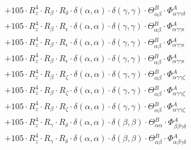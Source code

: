 \documentclass{article}
\begin{document}
\begin{subequations}
\begin{gather}
\begin{array}{c}
 \\[0.2em] 		 + 105 \cdot R_{z}^{4} \cdot R_{\beta{}} \cdot R_{\delta{}} \cdot \delta{}\left(\alpha{}, \alpha{}\right) \cdot \delta{}\left(\gamma{}, \gamma{}\right) \cdot \Theta{}^{B}_{\alpha{}\beta{}} \cdot \Phi{}^{A}_{\alpha{}\gamma{}\gamma{}\delta{}} 
 \\[0.2em] 		 + 105 \cdot R_{z}^{4} \cdot R_{\beta{}} \cdot R_{\epsilon{}} \cdot \delta{}\left(\alpha{}, \alpha{}\right) \cdot \delta{}\left(\gamma{}, \gamma{}\right) \cdot \Theta{}^{B}_{\alpha{}\beta{}} \cdot \Phi{}^{A}_{\alpha{}\gamma{}\gamma{}\epsilon{}} 
 \\[0.2em] 		 + 105 \cdot R_{z}^{4} \cdot R_{\beta{}} \cdot R_{\epsilon{}} \cdot \delta{}\left(\alpha{}, \alpha{}\right) \cdot \delta{}\left(\gamma{}, \gamma{}\right) \cdot \Theta{}^{B}_{\alpha{}\beta{}} \cdot \Phi{}^{A}_{\alpha{}\gamma{}\gamma{}\epsilon{}} 
 \\[0.2em] 		 + 105 \cdot R_{z}^{4} \cdot R_{\beta{}} \cdot R_{\epsilon{}} \cdot \delta{}\left(\alpha{}, \alpha{}\right) \cdot \delta{}\left(\gamma{}, \gamma{}\right) \cdot \Theta{}^{B}_{\alpha{}\beta{}} \cdot \Phi{}^{A}_{\alpha{}\gamma{}\gamma{}\epsilon{}} 
 \\[0.2em] 		 + 105 \cdot R_{z}^{4} \cdot R_{\beta{}} \cdot R_{\zeta{}} \cdot \delta{}\left(\alpha{}, \alpha{}\right) \cdot \delta{}\left(\gamma{}, \gamma{}\right) \cdot \Theta{}^{B}_{\alpha{}\beta{}} \cdot \Phi{}^{A}_{\alpha{}\gamma{}\gamma{}\zeta{}} 
 \\[0.2em] 		 + 105 \cdot R_{z}^{4} \cdot R_{\beta{}} \cdot R_{\zeta{}} \cdot \delta{}\left(\alpha{}, \alpha{}\right) \cdot \delta{}\left(\gamma{}, \gamma{}\right) \cdot \Theta{}^{B}_{\alpha{}\beta{}} \cdot \Phi{}^{A}_{\alpha{}\gamma{}\gamma{}\zeta{}} 
 \\[0.2em] 		 + 105 \cdot R_{z}^{4} \cdot R_{\beta{}} \cdot R_{\zeta{}} \cdot \delta{}\left(\alpha{}, \alpha{}\right) \cdot \delta{}\left(\gamma{}, \gamma{}\right) \cdot \Theta{}^{B}_{\alpha{}\beta{}} \cdot \Phi{}^{A}_{\alpha{}\gamma{}\gamma{}\zeta{}} 
 \\[0.2em] 		 + 105 \cdot R_{z}^{4} \cdot R_{\gamma{}} \cdot R_{\delta{}} \cdot \delta{}\left(\alpha{}, \alpha{}\right) \cdot \delta{}\left(\beta{}, \beta{}\right) \cdot \Theta{}^{B}_{\alpha{}\alpha{}} \cdot \Phi{}^{A}_{\beta{}\beta{}\gamma{}\delta{}} 
 \\[0.2em] 		 + 105 \cdot R_{z}^{4} \cdot R_{\gamma{}} \cdot R_{\delta{}} \cdot \delta{}\left(\alpha{}, \alpha{}\right) \cdot \delta{}\left(\beta{}, \beta{}\right) \cdot \Theta{}^{B}_{\alpha{}\beta{}} \cdot \Phi{}^{A}_{\alpha{}\beta{}\gamma{}\delta{}} 

\end{array}
\end{gather}
\end{subequations}
\end{document}
